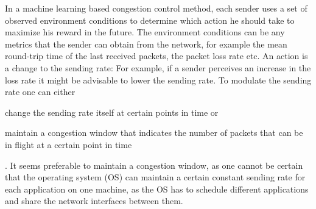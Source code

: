 \documentclass[sigconf]{acmart}
\begin{document}
In a machine learning based congestion control method, each sender uses a set of observed environment conditions to determine which action he should take to maximize his reward in the future. The environment conditions can be any metrics that the sender can obtain from the network, for example the mean round-trip time of the last received packets, the packet loss rate etc. An action is a change to the sending rate: For example, if a sender perceives an increase in the loss rate it might be advisable to lower the sending rate. To modulate the sending rate one can  either
\begin{enumerate*}
\item change the sending rate itself at certain points in time or
\item maintain a congestion window that indicates the number of packets that can be in flight at a certain point in time
\end{enumerate*}. It seems preferable to maintain a congestion window, as one cannot be certain that the operating system (OS) can maintain a certain constant sending rate for each application on one machine, as the OS has to schedule different applications and share the network interfaces between them. 
\end{document}
